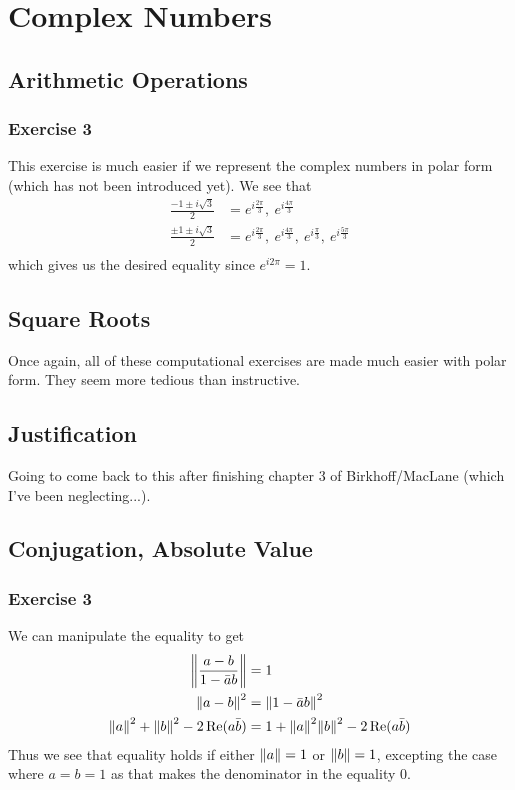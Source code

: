 \section{Complex Numbers}

\subsection{Arithmetic Operations}

\subsubsection{Exercise 3}
This exercise is much easier if we represent the complex numbers in polar form (which has not been introduced
yet). We see that
\begin{align*}
        \frac{-1 \pm i \sqrt{3}}{2} &= e^{i \frac{2\pi}{3}}, \: e^{i \frac{4 \pi}{3}} \\
        \frac{\pm 1 \pm i \sqrt{3}}{2} &= e^{i \frac{2\pi}{3}}, \: e^{i \frac{4 \pi}{3}}, \:  
        e^{i \frac{\pi}{3}}, \: e^{i \frac{5 \pi}{3}} \\
\end{align*}
which gives us the desired equality since $e^{i 2\pi} = 1$.

\subsection{Square Roots}
Once again, all of these computational exercises are made much easier with polar form. 
They seem more tedious than instructive.

\subsection{Justification}
Going to come back to this after finishing chapter 3 of Birkhoff/MacLane (which I've been neglecting...).

\subsection{Conjugation, Absolute Value}

\subsubsection{Exercise 3}
We can manipulate the equality to get
\begin{align*}
        \norm{\frac{a - b}{1 - \bar{a}b}} &= 1 \\
        \norm{a - b}^2 &= \norm{1 - \bar{a}b}^2 \\
        \norm{a}^2 + \norm{b}^2 - 2\Re(a\bar{b}) &= 1 + \norm{a}^2 \norm{b}^2 - 2\Re(a\bar{b}) 
\end{align*}
Thus we see that equality holds if either $\norm{a} = 1$ or $\norm{b} = 1$, excepting the case where 
$a = b = 1$ as that makes the denominator in the equality 0.


